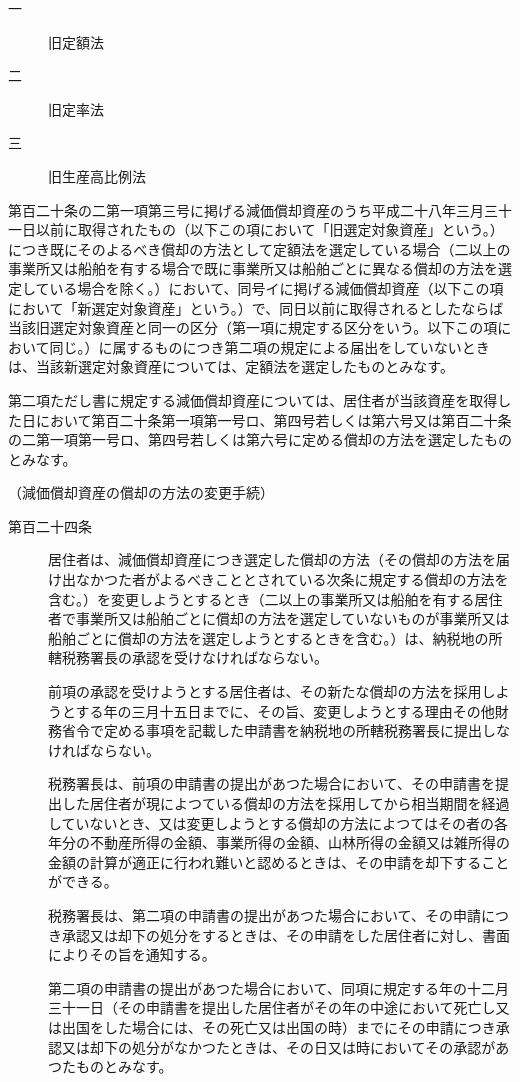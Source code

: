 \documentclass[twocolumn,a4j,10pt]{ltjtarticle}
\begin{document}
\begin{description}
\begin{description}
\item[一]旧定額法
\item[二]旧定率法
\item[三]旧生産高比例法
\end{description}
\item[\rensuji{4}]第百二十条の二第一項第三号に掲げる減価償却資産のうち平成二十八年三月三十一日以前に取得されたもの（以下この項において「旧選定対象資産」という。）につき既にそのよるべき償却の方法として定額法を選定している場合（二以上の事業所又は船舶を有する場合で既に事業所又は船舶ごとに異なる償却の方法を選定している場合を除く。）において、同号イに掲げる減価償却資産（以下この項において「新選定対象資産」という。）で、同日以前に取得されるとしたならば当該旧選定対象資産と同一の区分（第一項に規定する区分をいう。以下この項において同じ。）に属するものにつき第二項の規定による届出をしていないときは、当該新選定対象資産については、定額法を選定したものとみなす。
\item[\rensuji{5}]第二項ただし書に規定する減価償却資産については、居住者が当該資産を取得した日において第百二十条第一項第一号ロ、第四号若しくは第六号又は第百二十条の二第一項第一号ロ、第四号若しくは第六号に定める償却の方法を選定したものとみなす。
\end{description}
\noindent\hspace{10pt}（減価償却資産の償却の方法の変更手続）
\begin{description}
\item[第百二十四条]居住者は、減価償却資産につき選定した償却の方法（その償却の方法を届け出なかつた者がよるべきこととされている次条に規定する償却の方法を含む。）を変更しようとするとき（二以上の事業所又は船舶を有する居住者で事業所又は船舶ごとに償却の方法を選定していないものが事業所又は船舶ごとに償却の方法を選定しようとするときを含む。）は、納税地の所轄税務署長の承認を受けなければならない。
\item[]前項の承認を受けようとする居住者は、その新たな償却の方法を採用しようとする年の三月十五日までに、その旨、変更しようとする理由その他財務省令で定める事項を記載した申請書を納税地の所轄税務署長に提出しなければならない。
\item[]税務署長は、前項の申請書の提出があつた場合において、その申請書を提出した居住者が現によつている償却の方法を採用してから相当期間を経過していないとき、又は変更しようとする償却の方法によつてはその者の各年分の不動産所得の金額、事業所得の金額、山林所得の金額又は雑所得の金額の計算が適正に行われ難いと認めるときは、その申請を却下することができる。
\item[]税務署長は、第二項の申請書の提出があつた場合において、その申請につき承認又は却下の処分をするときは、その申請をした居住者に対し、書面によりその旨を通知する。
\item[]第二項の申請書の提出があつた場合において、同項に規定する年の十二月三十一日（その申請書を提出した居住者がその年の中途において死亡し又は出国をした場合には、その死亡又は出国の時）までにその申請につき承認又は却下の処分がなかつたときは、その日又は時においてその承認があつたものとみなす。
\end{description}
\end{document}
